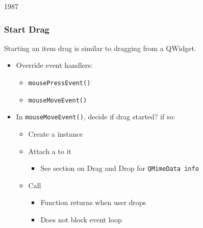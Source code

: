 \begin{slide}{1987}

\frametitle{Start Drag}
Starting an item drag is similar to dragging from a QWidget.
 \begin{itemize}
 \item Override event handlers:
     \begin{itemize}
     \item \texttt{mousePressEvent()}
     \item \texttt{mouseMoveEvent()}
     \end{itemize}
 \item In \texttt{mouseMoveEvent()}, decide if drag started? if so:
    \begin{itemize}
    \item Create a  instance

    \item Attach a  to it

        \begin{itemize}
        \item See section on Drag and Drop for \texttt{QMimeData info}
        \end{itemize}
    \item Call 

        \begin{itemize}
        \item Function returns when user drops
        \item Does not block event loop
        \end{itemize}
    \end{itemize}
\end{itemize}
\end{slide}


